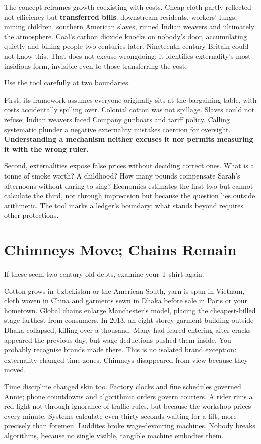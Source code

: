 The concept reframes growth coexisting with costs. Cheap cloth partly reflected not efficiency but \textbf{transferred bills}: downstream residents, workers' lungs, mining children, southern American slaves, ruined Indian weavers and ultimately the atmosphere. Coal's carbon dioxide knocks on nobody's door, accumulating quietly and billing people two centuries later. Nineteenth-century Britain could not know this. That does not excuse wrongdoing; it identifies externality's most insidious form, invisible even to those transferring the cost.

Use the tool carefully at two boundaries.

First, its framework assumes everyone originally sits at the bargaining table, with costs accidentally spilling over. Colonial cotton was not spillage. Slaves could not refuse; Indian weavers faced Company gunboats and tariff policy. Calling systematic plunder a negative externality mistakes coercion for oversight. \textbf{Understanding a mechanism neither excuses it nor permits measuring it with the wrong ruler.}

Second, externalities expose false prices without deciding correct ones. What is a tonne of smoke worth? A childhood? How many pounds compensate Sarah's afternoons without daring to sing? Economics estimates the first two but cannot calculate the third, not through imprecision but because the question lies outside arithmetic. The tool marks a ledger's boundary; what stands beyond requires other protections.

\section{Chimneys Move; Chains Remain}
If these seem two-century-old debts, examine your T-shirt again.

Cotton grows in Uzbekistan or the American South, yarn is spun in Vietnam, cloth woven in China and garments sewn in Dhaka before sale in Paris or your hometown. Global chains enlarge Manchester's model, placing the cheapest-billed stage farthest from consumers. In 2013, an eight-storey garment building outside Dhaka collapsed, killing over a thousand. Many had feared entering after cracks appeared the previous day, but wage deductions pushed them inside. You probably recognise brands made there. This is no isolated brand exception: externality changed time zones. Chimneys disappeared from view because they moved.

Time discipline changed skin too. Factory clocks and fine schedules governed Annie; phone countdowns and algorithmic orders govern couriers. A rider runs a red light not through ignorance of traffic rules, but because the workshop prices every minute. Systems calculate even thirty seconds waiting for a lift, more precisely than foremen. Luddites broke wage-devouring machines. Nobody breaks algorithms, because no single visible, tangible machine embodies them.

